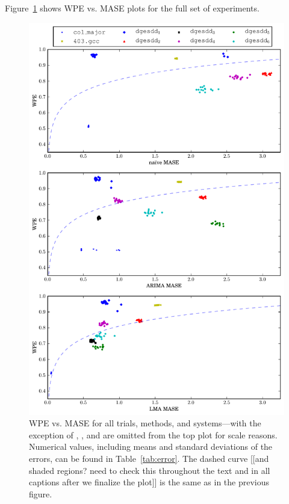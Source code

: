 Figure~\ref{fig:wpe_vs_mase_all} shows WPE vs. MASE plots for the full
set of experiments.
\begin{figure}
  \centering
  \includegraphics[width=\columnwidth]{figs/new_predictions_vs_entropy3}
\caption{WPE vs. MASE for all trials, methods, and systems---with the
  exception of \svdone, \svdthree, and \svdfive are omitted from the
  top plot for scale reasons.
%
%
Numerical values, including means and standard deviations of the
errors, can be found in Table~\ref{tab:error}.  The dashed curve [[and
    shaded regions?  need to check this throughout the text and in all
    captions after we finalize the plot]] is the same as in the
previous figure.  }
    \label{fig:wpe_vs_mase_all}
\end{figure}
